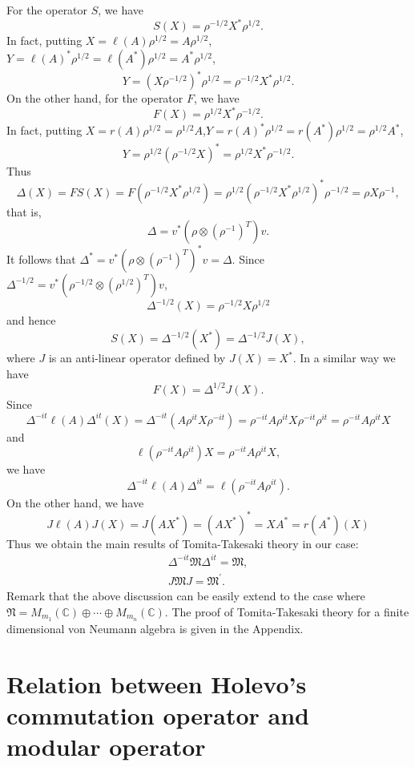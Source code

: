 \documentclass{article}
\begin{document}
For the operator $S$, we have 
	$$
    S(X)=\rho^{-1/2}X^*\rho^{1/2}.
 	$$
	In fact, putting $X=\ell(A)\rho^{1/2}=A\rho^{1/2}$,$Y=\ell(A)^\ast\rho^{1/2}=\ell(A^\ast)\rho^{1/2}=A^\ast \rho^{1/2}$,
	$$
    Y=(X\rho^{-1/2})^\ast \rho^{1/2}=\rho^{-1/2}X^\ast\rho^{1/2}.
  $$
On the other hand, for the operator $F$, we have
$$
F(X)=\rho^{1/2}X^\ast \rho^{-1/2}.
$$
In fact, putting $X=r(A)\rho^{1/2}=\rho^{1/2}A$,$Y=r(A)^\ast\rho^{1/2}=r(A^\ast)\rho^{1/2}= \rho^{1/2}A^\ast$,
	$$
    Y= \rho^{1/2}(\rho^{-1/2}X)^\ast=\rho^{1/2}X^\ast\rho^{-1/2}.
  $$
Thus
$$
\Delta(X)=FS(X)=F(\rho^{-1/2}X^*\rho^{1/2})=\rho^{1/2}(\rho^{-1/2}X^*\rho^{1/2})^\ast \rho^{-1/2}=\rho X \rho^{-1},
$$
that is, 
\begin{equation}\label{Delta}
\Delta=v^\ast(\rho \otimes ({\rho}^{-1})^T) v.
\end{equation}
It follows that $\Delta^\ast=v^\ast (\rho\otimes({\rho}^{-1})^T)^\ast v=\Delta$.
Since $\Delta^{-1/2}=v^\ast(\rho^{-1/2}\otimes ({\rho}^{1/2})^T) v$, 
$$
\Delta^{-1/2}(X)=\rho^{-1/2}X\rho^{1/2}
$$
and hence 
$$
S(X)=\Delta^{-1/2}(X^\ast)=\Delta^{-1/2}J(X),
$$
where $J$ is an anti-linear operator defined by $J(X)=X^\ast$.
In a similar way we have
$$
F(X)=\Delta^{1/2}J(X).
$$
Since
$$\Delta^{-it}\ell(A)\Delta^{it}(X)=\Delta^{-it}(A\rho^{it}X\rho^{-it})=\rho^{-it}A\rho^{it}X\rho^{-it}\rho^{it}=\rho^{-it}A\rho^{it}X$$
and 
$$
\ell(\rho^{-it}A\rho^{it})X=\rho^{-it}A\rho^{it}X,
$$
we have 
$$
\Delta^{-it}\ell(A)\Delta^{it}=\ell(\rho^{-it}A\rho^{it}).
$$
On the other hand,
we have
$$
J\ell(A)J(X)=J(AX^\ast)=(AX^\ast)^\ast=XA^\ast=r(A^\ast)(X)
$$
Thus we obtain the main results of Tomita-Takesaki theory in our case: 
\begin{equation}
\begin{split}
\Delta^{-it}\mathfrak{M}\Delta^{it}=\mathfrak{M},\\
          J\mathfrak{M}J=\mathfrak{M}^{\prime}.
\end{split}
\end{equation}
Remark that the above discussion can be easily extend to the case where 
$\mathfrak{N}=M_{m_1}(\mathbb{C})\oplus \cdots \oplus M_{m_n}(\mathbb{C})$.
The proof of Tomita-Takesaki theory for a finite dimensional von Neumann algebra is given in the Appendix.


\section{Relation between Holevo's commutation operator and modular operator}
\end{document}
